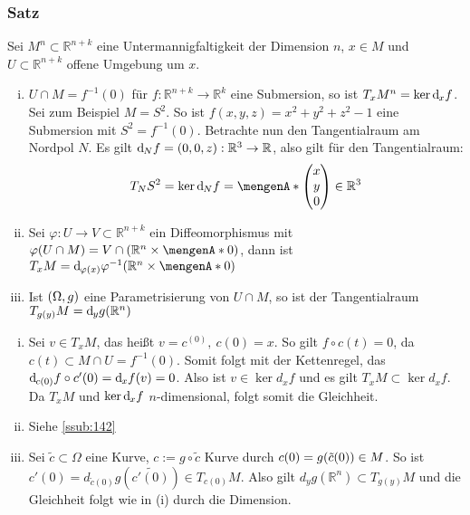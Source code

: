 \subsubsection{Satz}
\label{ssub:127}
Sei $M^n\subset \mathds{R}^{n+k}$ eine Untermannigfaltigkeit der Dimension $n$, $x\in M$ und $U\subset \mathds{R}^{n+k}$ offene Umgebung um $x$.
\begin{enumerate}[(i)]
\item $U\cap M = f^{-1}(0)$ für $f:\mathds{R}^{n+k} \to \mathds{R}^k$ eine Submersion, so ist $T_x M^n = \ker \mathrm{d}\mkern-1.0mu_x f$.\\
Sei zum Beispiel $M = S^2$. So ist $f(x,y,z)=x^2+y^2+z^2-1$ eine Submersion mit $S^2 = f^{-1}(0)$. Betrachte nun den Tangentialraum am Nordpol $N$. Es gilt $\mathrm{d}\mkern-1.0mu_N f = (0,0,z): \mathbb{R}^3 \to \mathbb{R}$, also gilt für den Tangentialraum: 
\[
T_N S^2 = \ker \mathd_N f = \set{
\begin{pmatrix}
x\\
y\\
0
\end{pmatrix}
\in \mathds{R}^3}
\]
\item Sei $\varphi: U\to V\subset \mathds{R}^{n+k}$ ein Diffeomorphismus mit $\varphi(U\cap M) = V\cap (\mathds{R}^n \times \set{0})$, dann ist $T_x M = \mathd_{\varphi(x)} \varphi^{-1}(\mathds{R}^n \times \set{0})$
\item Ist $(\Omega,g)$ eine Parametrisierung von $U\cap M$, so ist der Tangentialraum $T_{g(y)} M = \mathrm{d}\mkern-1.0mu_y g(\mathbb{R}^n)$
\end{enumerate} 
\begin{enumerate}[(i)]
\item Sei $v\in T_x M$, das heißt $v = c^(0),\ c(0) = x$. So gilt $f\circ c(t) = 0$, da $c(t)\subset M\cap U = f^{-1}(0)$. Somit folgt mit der Kettenregel, das $\mathrm{d}\mkern-1.0mu_{c(0)} f \circ c'(0) = \mathrm{d}\mkern-1.0mu_x f(v) = 0$. Also ist $v\in \ker d_x f$ und es gilt $T_x M \subset \ker d_x f$. Da $T_x M$ und $\ker \mathrm{d}\mkern-1.0mu_x f$ $n$-dimensional, folgt somit die Gleichheit.
\item Siehe \ref{ssub:142}
\item Sei $\tilde{c}\subset \Omega$ eine Kurve, $c := g\circ \tilde{c}$ Kurve durch $c(0) = g\enbrace*{\tilde{c}(0)}\in M$. So ist $c'(0) = d_{\tilde{c}(0)} g(\tilde{c'(0)})\in T_{c(0)} M$. Also gilt $d_y g(\mathds{R}^n) \subset T_{g(y)} M$ und die Gleichheit folgt wie in (i) durch die Dimension.
\end{enumerate}


